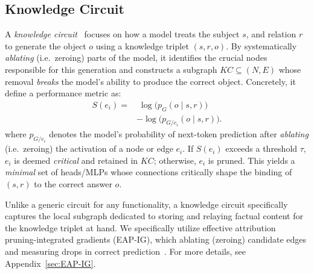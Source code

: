 \subsection{Knowledge Circuit}
\label{subsec:knowledge_circuit}
A \emph{knowledge circuit}~\citep{KC} focuses on how a model treats the subject $s$, and relation $r$ to generate the object $o$ using a knowledge triplet $(s,r,o)$. 
By systematically \emph{ablating} (i.e.\ zeroing) parts of the model, it identifies the crucial nodes responsible for this generation and constructs a subgraph $KC \subseteq (N,E)$ whose removal \emph{breaks} the model’s ability to produce the correct object.
Concretely, it define a performance metric as:
\begin{equation}
\begin{split}
S(e_i) = &\; \log\bigl(p_G(o \mid s,r)\bigr) \\
         &- \log\bigl(p_{G/e_i}(o \mid s,r)\bigr).
\end{split}
\label{eq:knw-circuit-score}
\end{equation}
where $p_{G/e_i}$ denotes the model’s probability of next-token prediction after \emph{ablating} (i.e.\ zeroing) the activation of a node or edge $e_i$. 
If $S(e_i)$ exceeds a threshold $\tau$, $e_i$ is deemed \emph{critical} and retained in $KC$; otherwise, $e_i$ is pruned. 
This yields a \emph{minimal} set of heads/MLPs whose connections critically shape the binding of $(s,r)$ to the correct answer $o$.

Unlike a generic circuit for any functionality, a knowledge circuit specifically captures the local subgraph dedicated to storing and relaying factual content for the knowledge triplet at hand.
We specifically utilize effective attribution pruning-integrated gradients (EAP-IG), which ablating (zeroing) candidate edges and measuring drops in correct prediction~\citep{eapig}. 
For more details, see Appendix~\ref{sec:EAP-IG}.
